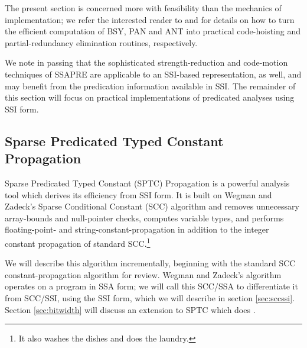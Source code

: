 \documentclass[12pt,titlepage,twoside]{article}
\begin{document}
The present section is concerned more with feasibility than the
mechanics of implementation; we refer the interested reader to
\cite{offner95} and \cite{johnson93:dfg} for details on how to turn
the efficient computation of BSY, PAN and ANT into practical
code-hoisting and partial-redundancy elimination routines, respectively.

We note in passing that the sophisticated strength-reduction and code-motion
techniques of SSAPRE \cite{kennedy98:strength} are applicable to an SSI-based
representation, as well, and may benefit from the predication
information available in SSI.  The remainder of this section will
focus on practical implementations of predicated analyses using SSI form.

\subsection{Sparse Predicated Typed Constant Propagation}
Sparse Predicated Typed Constant (SPTC) Propagation is a powerful
analysis tool which
derives its efficiency from SSI form.  It is built on Wegman and
Zadeck's Sparse Conditional Constant (SCC) algorithm
\cite{wegman91:scc} and removes unnecessary array-bounds and
null-pointer checks, computes variable types, and performs
floating-point- and string-constant-propagation in addition to the
integer constant propagation of standard SCC.\footnote{It also washes
the dishes and does the laundry.}

We will describe this algorithm incrementally, beginning with the
standard SCC constant-propagation algorithm for review.
Wegman and Zadeck's algorithm operates on a program in SSA form; we will
call this SCC/SSA to differentiate it from SCC/SSI, using the SSI
form, which we will describe in section \ref{sec:sccssi}. Section
\vref{sec:bitwidth} will discuss an extension to SPTC which does
.
\end{document}

